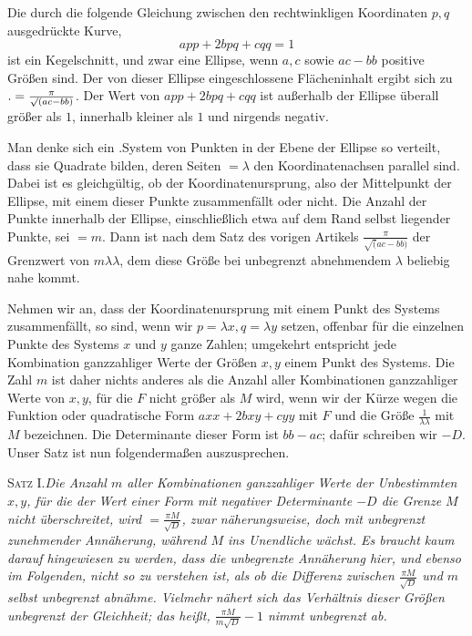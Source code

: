Die durch die folgende Gleichung zwischen den rechtwinkligen Koordinaten $p,q$ ausgedrückte Kurve,
\[
app+2bpq+cqq=1
\]
ist ein Kegelschnitt, und zwar eine Ellipse, wenn $a,c$ sowie $ac-bb$ positive Größen sind. Der von dieser Ellipse eingeschlossene Flächeninhalt ergibt sich zu $\mathbin{.}=\frac\pi{\surd(ac-bb)}$. Der Wert von $app+2bpq+cqq$ ist außerhalb der Ellipse überall größer als $1$, innerhalb kleiner als $1$ und nirgends negativ.

Man denke sich ein .System von Punkten in der Ebene der Ellipse so verteilt, dass sie Quadrate bilden, deren Seiten $=\lambda$ den Koordinatenachsen parallel sind. Dabei ist es gleichgültig, ob der Koordinatenursprung, also der Mittelpunkt der Ellipse, mit einem dieser Punkte zusammenfällt oder nicht. Die Anzahl der Punkte innerhalb der Ellipse, einschließlich etwa auf dem Rand selbst liegender Punkte, sei $=m$. Dann ist nach dem Satz des vorigen Artikels $\frac\pi{\surd(ac-bb)}$ der Grenzwert von $m\lambda\lambda$, dem diese Größe bei unbegrenzt abnehmendem $\lambda$ beliebig nahe kommt.

Nehmen wir an, dass der Koordinatenursprung mit einem Punkt des Systems zusammenfällt, so sind, wenn wir $p=\lambda x,q=\lambda y$ setzen, offenbar für die einzelnen Punkte des Systems $x$ und $y$ ganze Zahlen; umgekehrt entspricht jede Kombination ganzzahliger Werte der Größen
$x,y$ einem Punkt des Systems. Die Zahl $m$ ist daher nichts anderes als die Anzahl aller Kombinationen ganzzahliger Werte von $x,y$, für die $F$ nicht größer als $M$ wird, wenn wir der Kürze wegen die Funktion oder quadratische Form $axx+2bxy+cyy$ mit $F$ und die Größe $\frac1{\lambda\lambda}$ mit $M$ bezeichnen. Die Determinante dieser Form ist $bb-ac$; dafür schreiben wir $-D$. Unser Satz ist nun folgendermaßen auszusprechen.

\textsc{Satz I.}\quad\emph{Die Anzahl $m$ aller Kombinationen ganzzahliger Werte der Unbestimmten $x,y$, für die der Wert einer Form mit negativer Determinante $-D$ die Grenze $M$ nicht überschreitet, wird $=\frac{\pi M}{\surd D}$, zwar näherungsweise, doch mit unbegrenzt zunehmender Annäherung, während $M$ ins Unendliche wächst. Es braucht kaum darauf hingewiesen zu werden, dass die unbegrenzte Annäherung hier, und ebenso im Folgenden, nicht so zu verstehen ist, als ob die Differenz zwischen $\frac{\pi M}{\surd D}$ und $m$ selbst unbegrenzt abnähme. Vielmehr nähert sich das Verhältnis dieser Größen unbegrenzt der Gleichheit; das heißt, $\frac{\pi M}{m\surd D}-1$ nimmt unbegrenzt ab.}

